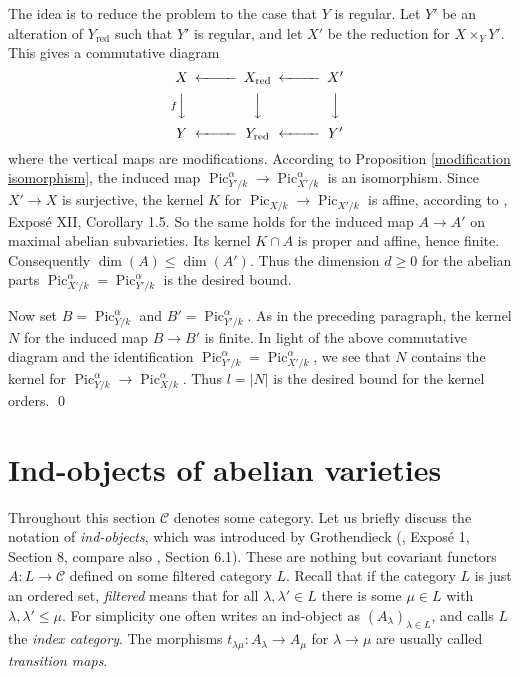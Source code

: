 \documentclass[oneside, 12pt]{amsart}
\newcommand\mylabel[1]{\label{#1}\marginpar{\vspace{-1ex}\medskip\medskip\footnotesize \tt #1}}
\renewcommand\mylabel[1]{\label{#1}}
\theoremstyle{definition}
\theoremstyle{remark}
\newcommand{\catC}{\mathcal{C}}
\newcommand{\Pic}{\operatorname{Pic}}
\newcommand{\ra}{\rightarrow}
\newcommand{\red}{{\operatorname{red}}}
\begin{document}
\proof
The idea is to reduce the problem to the case that  $Y$ is regular.
Let $Y'$ be an alteration of $Y_\red$ such that       $Y'$ is regular, and let $X'$ be the reduction 
for $X\times_YY'$. This gives a commutative diagram
$$
\begin{CD}
X	@<<<	X_\red	@<<<	X'\\
@VfVV		@VVV		@VVV\\
Y	@<<<	Y_\red	@<<<	Y' 
\end{CD}
$$
where  the vertical maps are modifications.
According to Proposition \ref{modification isomorphism}, the induced map $\Pic^\alpha_{Y'/k}\ra \Pic^\alpha_{X'/k}$ is an isomorphism.
Since $X' \ra X$ is   surjective,   the kernel $K$
for   $\Pic_{X/k}\ra\Pic_{X'/k}$ is affine, according to \cite{SGA 6}, Expos\'e XII, Corollary 1.5. 
So the same holds for the induced map $A\ra A'$ on maximal abelian subvarieties. 
Its kernel $K\cap A$ is proper and affine, hence finite. Consequently $\dim(A)\leq \dim(A')$.
Thus the dimension $d\geq 0$ for the abelian parts $\Pic^\alpha_{X'/k}=\Pic^\alpha_{Y'/k}$ is the desired bound.
 
Now set $B=\Pic^\alpha_{Y/k}$ and $B'=\Pic^\alpha_{Y'/k}$. As in the preceding paragraph, the kernel $N$
for the induced map $B\ra B'$ is finite.  In light of the above commutative diagram
and the identification $\Pic^\alpha_{Y'/k}=\Pic^\alpha_{X'/k}$, we see that $N$ contains
the kernel for $\Pic^\alpha_{Y/k}\ra\Pic^\alpha_{X/k}$. Thus $l=|N|$ is the desired bound
for the kernel orders.
\qed


\section{Ind-objects of abelian varieties}
\mylabel{Ind-objects}

\newcommand{\Ind}{\operatorname{Ind}}
Throughout this section  $\catC$ denotes  some category. Let us  briefly discuss    the notation of \emph{ind-objects},
which was introduced by Grothendieck 
(\cite{SGA 4a}, Expos\'e 1, Section 8, compare also  \cite{Kashiwara; Schapira 2006}, Section 6.1).
These are  nothing but   covariant functors $A:L\ra \catC$ defined on some  filtered category $L$.
Recall that if  the category $L$ is just an ordered set, \emph{filtered}  
 means that for all $\lambda,\lambda'\in L$ there is some $\mu\in L$ with $\lambda,\lambda'\leq \mu$.
For simplicity one often writes an ind-object as $(A_\lambda)_{\lambda\in L}$, and 
calls $L$ the \emph{index category}. The morphisms $t_{\lambda\mu}:A_\lambda\ra A_\mu$ for $\lambda\ra \mu$
are usually  called \emph{transition maps}.
\end{document}
